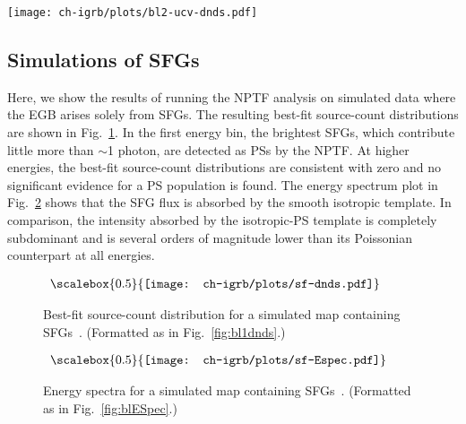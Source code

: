 \begin{figure*}[b] %
   \centering
   \texttt{[image: ch-igrb/plots/bl2-ucv-dnds.pdf]} 
   \caption{Best-fit source-count distribution, as a function of energy, obtained from simulating the Blazar--2 model with top three quartiles of \emph{ultracleanveto} data.  (Formatted as in Fig.~\ref{fig:bl1dnds}.)}
   \label{fig:dndsb2UCV}
\end{figure*}


\subsection{Simulations of SFGs}
\label{app:sfgsims}

Here, we show the results of running the NPTF analysis on simulated data where the EGB arises solely from SFGs.  The resulting best-fit source-count distributions are shown in Fig.~\ref{fig:simdata_sfg}.  In the first energy bin, the brightest SFGs, which contribute little more than $\sim$1 photon, are detected as PSs by the NPTF.  At higher energies, the best-fit source-count distributions are consistent with zero and no significant evidence for a PS population is found.  The energy spectrum plot in Fig.~\ref{fig:spec_sfg} shows that the SFG flux is absorbed by the smooth isotropic template.  In comparison, the intensity absorbed by the isotropic-PS template is completely subdominant and is several orders of magnitude lower than its Poissonian counterpart at all energies.

\begin{figure}[b] %
   	\begin{center}$
	\begin{array}{c}
	\scalebox{0.5}{\texttt{[image: ch-igrb/plots/sf-dnds.pdf]}} 
		\end{array}$
	\end{center}
   \caption{Best-fit source-count distribution for a simulated map containing SFGs~\cite{Tamborra:2014xia}.  (Formatted as in Fig.~\ref{fig:bl1dnds}.) 
 }
   \label{fig:simdata_sfg} 
\end{figure}

\begin{figure}[htbp] %
   	\begin{center}$
	\begin{array}{c}
	\scalebox{0.5}{\texttt{[image: ch-igrb/plots/sf-Espec.pdf]}} 
		\end{array}$
	\end{center}
   \caption{Energy spectra for a simulated map containing SFGs~\cite{Tamborra:2014xia}.  (Formatted as in Fig.~\ref{fig:blESpec}.) }
   \label{fig:spec_sfg} 
\end{figure}

